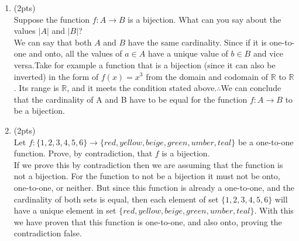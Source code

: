 \documentclass[12pt]{article}
\begin{document}
\begin{enumerate}
\item  (2pts) \\Suppose the function $f : A \rightarrow B$ is a bijection. What can you say about the values $|A|$ and $|B|$?
    \\We can say that both $A$ and $B$ have the same cardinality. Since if it is one-to-one and onto, all the values of $a \in A$ have a unique value of $b \in B$ and vice versa.Take for example a function that is a bijection (since it can also be inverted) in the form of $f(x) = x^3$ from the domain and codomain of $\mathbb{R}$ to $\mathbb{R}$. Its range is $\mathbb{R}$, and it meets the condition stated above.$\therefore$We can conclude that the cardinality of A and B have to be equal for the function $f : A \rightarrow B$ to be a bijection.

\item  (2pts) \\Let \(f:\lbrace{1,2,3,4,5,6}\rbrace \rightarrow \lbrace{red,yellow,beige, green,umber,teal}\rbrace\) be a one-to-one function. Prove, by contradiction,  that \(f\) is a bijection.
    \\If we prove this by contradiction then we are assuming that the function is not a bijection. For the function to not be a bijection it must not be onto, one-to-one, or neither. But since this function is already a one-to-one, and the cardinality of both sets is equal, then each element of set $\{1,2,3,4,5,6\}$ will have a unique element in set $\{red,yellow,beige, green,umber,teal\}$. With this we have proven that this function is one-to-one, and also onto, proving the contradiction false.


\end{enumerate}
\end{document}
